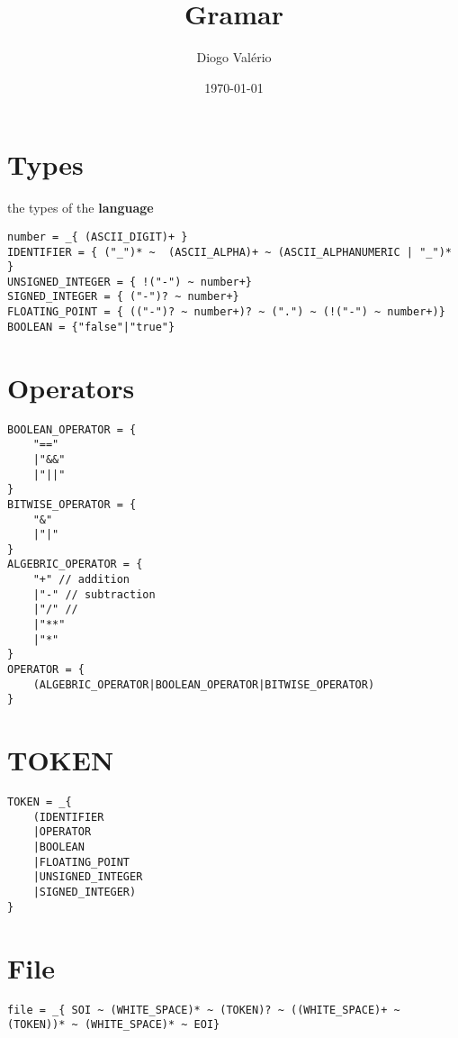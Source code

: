 \documentclass[11pt]{article}
\author{Diogo Valério}
\date{\today}
\title{Gramar}
\begin{document}
\maketitle
\tableofcontents

\section{Types}
\label{sec:org50f6933}
the types of the \textbf{language}
\begin{verbatim}
number = _{ (ASCII_DIGIT)+ }
IDENTIFIER = { ("_")* ~  (ASCII_ALPHA)+ ~ (ASCII_ALPHANUMERIC | "_")* }
UNSIGNED_INTEGER = { !("-") ~ number+}
SIGNED_INTEGER = { ("-")? ~ number+}
FLOATING_POINT = { (("-")? ~ number+)? ~ (".") ~ (!("-") ~ number+)}
BOOLEAN = {"false"|"true"}
\end{verbatim}
\section{Operators}
\label{sec:org42bd8e7}
\begin{verbatim}
BOOLEAN_OPERATOR = {
    "=="
    |"&&"
    |"||"
}
BITWISE_OPERATOR = {
    "&"
    |"|"
}
ALGEBRIC_OPERATOR = {
    "+" // addition
    |"-" // subtraction
    |"/" //
    |"**"
    |"*"
}
OPERATOR = {
    (ALGEBRIC_OPERATOR|BOOLEAN_OPERATOR|BITWISE_OPERATOR)
}
\end{verbatim}
\section{TOKEN}
\label{sec:orgc747c42}
\begin{verbatim}
TOKEN = _{
    (IDENTIFIER
    |OPERATOR
    |BOOLEAN
    |FLOATING_POINT
    |UNSIGNED_INTEGER
    |SIGNED_INTEGER)
}
\end{verbatim}
\section{File}
\label{sec:orga24e470}
\begin{verbatim}
file = _{ SOI ~ (WHITE_SPACE)* ~ (TOKEN)? ~ ((WHITE_SPACE)+ ~ (TOKEN))* ~ (WHITE_SPACE)* ~ EOI}
\end{verbatim}
\end{document}
